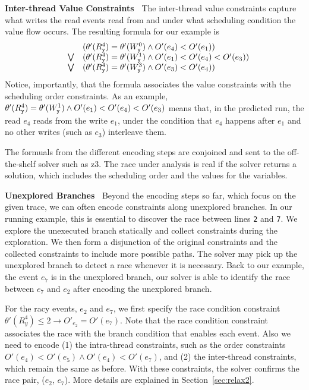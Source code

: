 {\bf Inter-thread Value Constraints\ } The inter-thread value constraints capture what writes the read events read from and under what scheduling condition the value flow occurs.  The resulting formula for our example is
$$
\begin{array}{lcl}
	& & (\theta'(R_{\tt y}^4)=\theta'(W_{\tt y}^0) \wedge O'(e_4) < O'(e_1) ) \\
& \bigvee &
	(\theta'(R_{\tt y}^4)=\theta'(W_{\tt y}^1) \wedge O'(e_1) < O'(e_4) < O'(e_3)) \\
& \bigvee &
	(\theta'(R_{\tt y}^4)=\theta'(W_{\tt y}^3) \wedge O'(e_3) < O'(e_4))
\end{array}
$$    
Notice, importantly, that the formula associates the value constraints with the scheduling order constraints. 
 As an example, 
$\theta'(R_{\tt y}^4)=\theta'(W_{\tt y}^1) \wedge O'(e_1) < O'(e_4) < O'(e_3)$ means that, in the predicted run, the read $e_4$ reads from the write $e_1$, under the condition that $e_4$ happens after $e_1$ and no other  writes (such as $e_3$) interleave them.

The formuals from the different encoding steps are conjoined and sent to the off-the-shelf solver such as {\sf z3}.  The race under analysis is real if the solver returns a solution, which includes the scheduling order and the values for the variables. 



{\bf Unexplored Branches\ } Beyond the encoding steps so far, which focus on the given trace, we can often encode constraints along unexplored branches. In our running example, this is essential to discover the race between lines {\tt 2} and {\tt 7}. We explore the unexecuted branch statically and collect constraints during the exploration. We then form a disjunction  of the original constraints and the collected constraints to include more possible  paths. The solver may pick up the unexplored branch to detect a race whenever it is necessary. Back to our example, the event $e_7$ is in the unexplored branch, our solver is able to identify the race between $e_7$ and $e_2$ after encoding the unexplored branch. 

For the racy events, $e_2$ and $e_7$, we first specify the race condition constraint  $\theta'(R^4_y)\leq 2\rightarrow O'_{e_2}=O'(e_7)$. Note that the race condition constraint associates the race with the branch condition that enables each event.  Also we need to encode (1) the intra-thread constraints, such as the  order constraints $O'(e_4)<O'(e_5)\wedge O'(e_4)<O'(e_7)$, and (2) the inter-thread constraints, which remain the same as before. With these constraints, the solver confirms the race pair, ($e_2$, $e_7$). More details are explained in Section~\ref{sec:relax2}.





